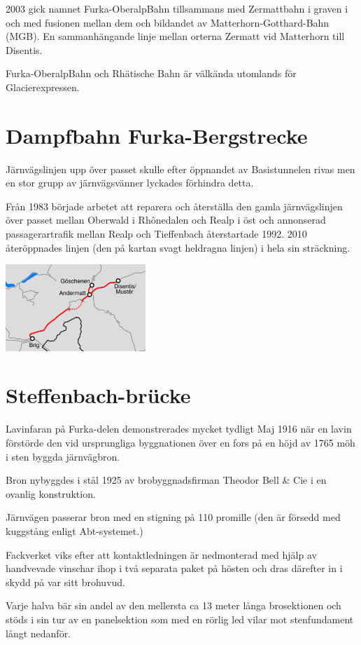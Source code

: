 \documentclass[notitlepage,10pt,swedish,a4paper]{article}
\begin{document}
2003 gick namnet Furka-OberalpBahn tillsammans med Zermattbahn i graven i och med fusionen mellan dem och bildandet av Matterhorn-Gotthard-Bahn (MGB). En sammanhängande linje mellan orterna Zermatt vid Matterhorn till Disentis.

Furka-OberalpBahn och Rhätische Bahn är välkända utomlands för Glacierexpressen.

\section{Dampfbahn Furka-Bergstrecke}

Järnvägslinjen upp över passet skulle efter öppnandet av Basistunnelen rivas men en stor grupp av järnvägsvänner lyckades förhindra detta.

Från 1983 började arbetet att reparera och återställa den gamla järnvägslinjen över passet mellan Oberwald i Rhônedalen och Realp i öst och annonserad passagerartrafik mellan Realp och Tieffenbach återstartade 1992.
2010 återöppnades linjen (den på kartan svagt heldragna linjen) i hela sin sträckning.

\includegraphics[width=150pt]{350px-FO_Bahnnetz}

\section{Steffenbach-brücke}
\label{sec:steffenbachbrucke}

Lavinfaran på Furka-delen demonstrerades mycket tydligt Maj 1916 när en lavin förstörde den vid ursprungliga byggnationen
över en fors på en höjd av 1765 möh i sten byggda järnvägbron.

Bron nybyggdes i stål 1925 av brobyggnadsfirman Theodor Bell \& Cie i en ovanlig konstruktion.

Järnvägen passerar bron med en stigning på 110 promille (den är försedd med kuggstång enligt Abt-systemet.)

Fackverket viks efter att kontaktledningen är nedmonterad med hjälp av handvevade vinschar ihop i två separata paket på hösten och dras därefter in i skydd på var sitt brohuvud.

Varje halva bär sin andel av den mellersta ca 13 meter långa brosektionen och stöds i sin tur av en panelsektion som med en rörlig led vilar mot stenfundament långt nedanför.
\end{document}
